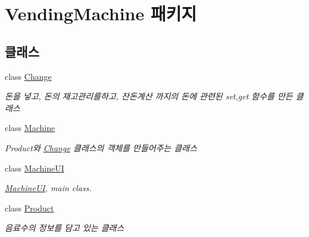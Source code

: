 \hypertarget{namespace_vending_machine}{}\section{Vending\+Machine 패키지}
\label{namespace_vending_machine}
\subsection*{클래스}
\begin{DoxyCompactItemize}
\item 
class \hyperlink{class_vending_machine_1_1_change}{Change}
\begin{DoxyCompactList}\small\item\em 돈을 넣고, 돈의 재고관리를하고, 잔돈계산 까지의 돈에 관련된 set,get 함수를 만든 클래스 \end{DoxyCompactList}\item 
class \hyperlink{class_vending_machine_1_1_machine}{Machine}
\begin{DoxyCompactList}\small\item\em Product와 \hyperlink{class_vending_machine_1_1_change}{Change} 클래스의 객체를 만들어주는 클래스 \end{DoxyCompactList}\item 
class \hyperlink{class_vending_machine_1_1_machine_u_i}{Machine\+UI}
\begin{DoxyCompactList}\small\item\em \hyperlink{class_vending_machine_1_1_machine_u_i}{Machine\+UI}, main class. \end{DoxyCompactList}\item 
class \hyperlink{class_vending_machine_1_1_product}{Product}
\begin{DoxyCompactList}\small\item\em 음료수의 정보를 담고 있는 클래스 \end{DoxyCompactList}\end{DoxyCompactItemize}
